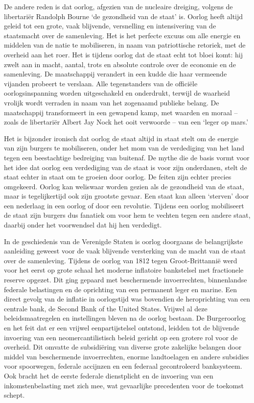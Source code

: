 \documentclass[
  a5paper,
  smalldemyvopaper,10pt,twoside,onecolumn,openright,extrafontsizes,hidelinks]{memoir}
\begin{document}
De andere reden is dat oorlog, afgezien van de nucleaire dreiging,
volgens de libertariër Randolph Bourne `de gezondheid van de staat' is.
Oorlog heeft altijd geleid tot een grote, vaak blijvende, versnelling en
intensivering van de staatsmacht over de samenleving. Het is het
perfecte excuus om alle energie en middelen van de natie te mobiliseren,
in naam van patriottische retoriek, met de overheid aan het roer. Het is
tijdens oorlog dat de staat echt tot bloei komt: hij zwelt aan in macht,
aantal, trots en absolute controle over de economie en de samenleving.
De maatschappij verandert in een kudde die haar vermeende vijanden
probeert te verslaan. Alle tegenstanders van de officiële
oorlogsinspanning worden uitgeschakeld en onderdrukt, terwijl de
waarheid vrolijk wordt verraden in naam van het zogenaamd publieke
belang. De maatschappij transformeert in een gewapend kamp, met waarden
en moraal -- zoals de libertariër Albert Jay Nock het ooit verwoorde --
van een `leger op mars.'

Het is bijzonder ironisch dat oorlog de staat altijd in staat stelt om
de energie van zijn burgers te mobiliseren, onder het mom van de
verdediging van het land tegen een beestachtige bedreiging van buitenaf.
De mythe die de basis vormt voor het idee dat oorlog een verdediging van
de staat is voor zijn onderdanen, stelt de staat echter in staat om te
groeien door oorlog. De feiten zijn echter precies omgekeerd. Oorlog kan
weliswaar worden gezien als de gezondheid van de staat, maar is
tegelijkertijd ook zijn grootste gevaar. Een staat kan alleen `sterven'
door een nederlaag in een oorlog of door een revolutie. Tijdens een
oorlog mobiliseert de staat zijn burgers dus fanatiek om voor hem te
vechten tegen een andere staat, daarbij onder het voorwendsel dat hij
hen verdedigt.

In de geschiedenis van de Verenigde Staten is oorlog doorgaans de
belangrijkste aanleiding geweest voor de vaak blijvende versterking van
de macht van de staat over de samenleving. Tijdens de oorlog van 1812
tegen Groot-Brittannië werd voor het eerst op grote schaal het moderne
inflatoire bankstelsel met fractionele reserve opgezet. Dit ging gepaard
met beschermende invoerrechten, binnenlandse federale belastingen en de
oprichting van een permanent leger en marine. Een direct gevolg van de
inflatie in oorlogstijd was bovendien de heroprichting van een centrale
bank, de Second Bank of the United States. Vrijwel al deze
beleidsmaatregelen en instellingen bleven na de oorlog bestaan. De
Burgeroorlog en het feit dat er een vrijwel eenpartijstelsel ontstond,
leidden tot de blijvende invoering van een neomercantilistisch beleid
gericht op een grotere rol voor de overheid. Dit omvatte de subsidiëring
van diverse grote zakelijke belangen door middel van beschermende
invoerrechten, enorme landtoelagen en andere subsidies voor spoorwegen,
federale accijnzen en een federaal gecontroleerd banksysteem. Ook bracht
het de eerste federale dienstplicht en de invoering van een
inkomstenbelasting met zich mee, wat gevaarlijke precedenten voor de
toekomst schept.
\end{document}
